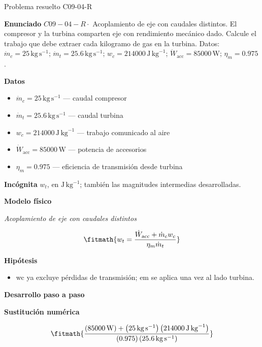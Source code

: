 \documentclass[10pt,openany]{book}
\begin{document}
\begin{studiumworked}{Problema resuelto C09-04-R}


\noindent\textbf{Enunciado}
\(C09-04-R \cdot\) Acoplamiento de eje con caudales distintos. El compresor y la turbina comparten eje con rendimiento mecánico dado. Calcule el trabajo que debe extraer cada kilogramo de gas en la turbina. Datos: \(\dot{m}_c=25\, \mathrm{kg}\,\mathrm{s}^{-1}\); \(\dot{m}_t=25.6\, \mathrm{kg}\,\mathrm{s}^{-1}\); \(w_c=214000\, \mathrm{J}\,\mathrm{kg}^{-1}\); \(\dot{W}_{\mathrm{acc}}=85000\, \mathrm{W}\); \(\eta_m=0.975\).

\noindent\textbf{Datos}
\begin{itemize}
\item $\dot{m}_c = 25\,\mathrm{kg}\,\mathrm{s}^{-1}$ — caudal compresor
\item $\dot{m}_t = 25.6\,\mathrm{kg}\,\mathrm{s}^{-1}$ — caudal turbina
\item $w_c = 214000\,\mathrm{J}\,\mathrm{kg}^{-1}$ — trabajo comunicado al aire
\item $\dot{W}_{\mathrm{acc}} = 85000\,\mathrm{W}$ — potencia de accesorios
\item $\eta_m = 0.975$ — eficiencia de transmisión desde turbina
\end{itemize}

\noindent\textbf{Incógnita}
$w_t$, en $\mathrm{J\,kg^{-1}}$; también las magnitudes intermedias desarrolladas.

\noindent\textbf{Modelo físico}

\noindent\textit{Acoplamiento de eje con caudales distintos}

\[
\fitmath{w_t=\frac{\dot{W}_{\mathrm{acc}} + \dot{m}_c w_c}{\eta_m \dot{m}_t}}
\]

\noindent\textbf{Hipótesis}
\begin{itemize}
\item wc ya excluye pérdidas de transmisión; em se aplica una vez al lado turbina.
\end{itemize}

\noindent\textbf{Desarrollo paso a paso}



\noindent\textbf{Sustitución numérica}

\[
\fitmath{\frac{\left(85000\,\mathrm{W}\right) + \left(25\,\mathrm{kg}\,\mathrm{s}^{-1}\right) \left(214000\,\mathrm{J}\,\mathrm{kg}^{-1}\right)}{\left(0.975\right) \left(25.6\,\mathrm{kg}\,\mathrm{s}^{-1}\right)}}
\]


\end{studiumworked}
\end{document}
